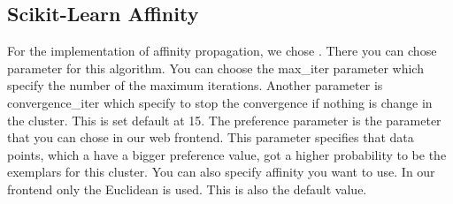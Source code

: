 \subsection{Scikit-Learn Affinity}
\label{subsec:sklearn_affinity}

For the implementation of affinity propagation, we chose \cite{sklearn_api}. There you can chose parameter for this algorithm. You can choose the max\_iter parameter which specify the number of the maximum iterations. Another parameter is convergence\_iter which specify to stop the convergence if nothing is change in the cluster. This is set default at 15. The preference parameter is the parameter that you can chose in our web frontend. This parameter specifies that data points, which a have a bigger preference value, got a higher probability to be the exemplars for this cluster. You can also specify affinity you want to use. In our frontend only the Euclidean is used. This is also the default value. 